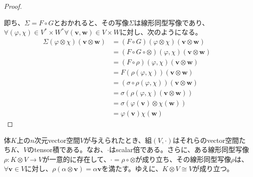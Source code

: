 \documentclass[dvipdfmx]{jsarticle}
\begin{document}
\begin{proof}
\begin{center}
\end{center}
即ち、$\varSigma = F \circ G$とおかれると、その写像$\varSigma$は線形同型写像であり、$\forall(\varphi,\chi) \in V^{*} \times W^{*}\forall\left( \mathbf{v},\mathbf{w} \right) \in V \times W$に対し、次のようになる。
\begin{align*}
\varSigma(\varphi \otimes \chi)\left( \mathbf{v} \otimes \mathbf{w} \right) &= (F \circ G)(\varphi \otimes \chi)\left( \mathbf{v} \otimes \mathbf{w} \right)\\
&= (F \circ G \circ \otimes )(\varphi,\chi)\left( \mathbf{v} \otimes \mathbf{w} \right)\\
&= (F \circ \rho)(\varphi,\chi)\left( \mathbf{v} \otimes \mathbf{w} \right)\\
&= F\left( \rho(\varphi,\chi) \right)\left( \mathbf{v} \otimes \mathbf{w} \right)\\
&= \left( \sigma \circ \rho(\varphi,\chi) \right)\left( \mathbf{v} \otimes \mathbf{w} \right)\\
&= \sigma\left( \rho(\varphi,\chi)\left( \mathbf{v} \otimes \mathbf{w} \right) \right)\\
&= \sigma\left( \varphi\left( \mathbf{v} \right) \otimes \chi\left( \mathbf{w} \right) \right)\\
&= \varphi\left( \mathbf{v} \right)\chi\left( \mathbf{w} \right)
\end{align*}
\end{proof}
\begin{thm}\label{2.4.5.15}
体$K$上の$n$次元vector空間$V$が与えられたとき、組$(V, \cdot )$はそれらのvector空間たち$K$、$V$のtensor積である。なお、$\cdot$はscalar倍である。さらに、ある線形同型写像$\rho:K \otimes V \rightarrow V$が一意的に存在して、$\cdot = \rho \circ \otimes$が成り立ち、その線形同型写像$\rho$は、$\forall\mathbf{v} \in V$に対し、$\rho\left( \alpha \otimes \mathbf{v} \right) = \alpha\mathbf{v}$を満たす。ゆえに、$K \otimes V \cong V$が成り立つ。
\end{thm}
\end{document}
